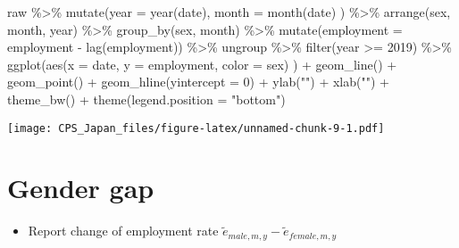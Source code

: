 \documentclass[
]{book}
\newenvironment{Shaded}{\begin{snugshade}}{\end{snugshade}}
\newcommand{\AttributeTok}[1]{\textcolor[rgb]{0.77,0.63,0.00}{#1}}
\newcommand{\DecValTok}[1]{\textcolor[rgb]{0.00,0.00,0.81}{#1}}
\newcommand{\FunctionTok}[1]{\textcolor[rgb]{0.00,0.00,0.00}{#1}}
\newcommand{\NormalTok}[1]{#1}
\newcommand{\SpecialCharTok}[1]{\textcolor[rgb]{0.00,0.00,0.00}{#1}}
\newcommand{\StringTok}[1]{\textcolor[rgb]{0.31,0.60,0.02}{#1}}
\providecommand{\tightlist}{%
  \setlength{\itemsep}{0pt}\setlength{\parskip}{0pt}}
\begin{document}
\begin{Shaded}
\begin{Highlighting}[]
\NormalTok{raw }\SpecialCharTok{\%\textgreater{}\%}
  \FunctionTok{mutate}\NormalTok{(}\AttributeTok{year =} \FunctionTok{year}\NormalTok{(date),}
         \AttributeTok{month =} \FunctionTok{month}\NormalTok{(date)}
\NormalTok{         ) }\SpecialCharTok{\%\textgreater{}\%}
  \FunctionTok{arrange}\NormalTok{(sex,}
\NormalTok{          month,}
\NormalTok{          year) }\SpecialCharTok{\%\textgreater{}\%}
  \FunctionTok{group\_by}\NormalTok{(sex,}
\NormalTok{           month) }\SpecialCharTok{\%\textgreater{}\%}
  \FunctionTok{mutate}\NormalTok{(}\AttributeTok{employment =}\NormalTok{ employment }\SpecialCharTok{{-}} \FunctionTok{lag}\NormalTok{(employment)) }\SpecialCharTok{\%\textgreater{}\%}
\NormalTok{  ungroup }\SpecialCharTok{\%\textgreater{}\%}
  \FunctionTok{filter}\NormalTok{(year }\SpecialCharTok{\textgreater{}=} \DecValTok{2019}\NormalTok{) }\SpecialCharTok{\%\textgreater{}\%}
  \FunctionTok{ggplot}\NormalTok{(}\FunctionTok{aes}\NormalTok{(}\AttributeTok{x =}\NormalTok{ date,}
             \AttributeTok{y =}\NormalTok{ employment,}
             \AttributeTok{color =}\NormalTok{ sex)}
\NormalTok{         ) }\SpecialCharTok{+}
  \FunctionTok{geom\_line}\NormalTok{() }\SpecialCharTok{+}
  \FunctionTok{geom\_point}\NormalTok{() }\SpecialCharTok{+}
  \FunctionTok{geom\_hline}\NormalTok{(}\AttributeTok{yintercept =} \DecValTok{0}\NormalTok{) }\SpecialCharTok{+}
  \FunctionTok{ylab}\NormalTok{(}\StringTok{""}\NormalTok{) }\SpecialCharTok{+}
  \FunctionTok{xlab}\NormalTok{(}\StringTok{""}\NormalTok{) }\SpecialCharTok{+}
  \FunctionTok{theme\_bw}\NormalTok{() }\SpecialCharTok{+}
  \FunctionTok{theme}\NormalTok{(}\AttributeTok{legend.position =} \StringTok{"bottom"}\NormalTok{)}
\end{Highlighting}
\end{Shaded}

\texttt{[image: CPS\_Japan\_files/figure-latex/unnamed-chunk-9-1.pdf]}

\hypertarget{gender-gap-1}{%
\section{Gender gap}\label{gender-gap-1}}

\begin{itemize}
\tightlist
\item
  Report change of employment rate \(\tilde e_{male,m,y} - \tilde e_{female,m,y}\)
\end{itemize}
\end{document}
